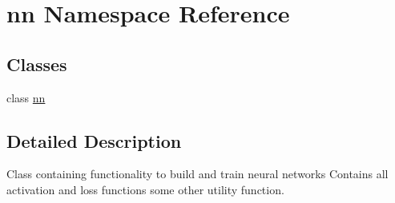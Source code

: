 \hypertarget{namespacenn}{}\section{nn Namespace Reference}
\label{namespacenn}
\subsection*{Classes}
\begin{DoxyCompactItemize}
\item 
class \mbox{\hyperlink{classnn_1_1nn}{nn}}
\end{DoxyCompactItemize}


\subsection{Detailed Description}
\begin{DoxyVerb}Class containing functionality to build and train neural networks
Contains all activation and loss functions some other utility function.
\end{DoxyVerb}
 